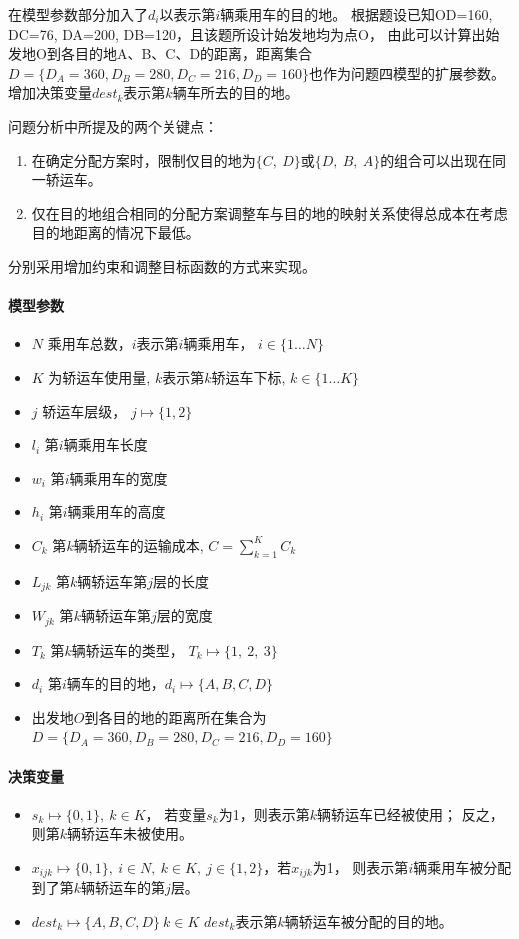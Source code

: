 \documentclass[UTF8]{ctexart}
\begin{document}
	在模型参数部分加入了$d_i$以表示第$i$辆乘用车的目的地。
	根据题设已知OD=160, DC=76, DA=200, DB=120，且该题所设计始发地均为点O，
	由此可以计算出始发地O到各目的地A、B、C、D的距离，距离集合
	$D=\{D_A=360, D_B=280, D_C=216, D_D=160\}$也作为问题四模型的扩展参数。\\
	
	增加决策变量$dest_k$表示第$k$辆车所去的目的地。
	
	问题分析中所提及的两个关键点：
	\begin{enumerate}
		\item 在确定分配方案时，限制仅目的地为$\{C,~D\}$或$\{D,~B,~A\}$的组合可以出现在同一轿运车。
		\item 仅在目的地组合相同的分配方案调整车与目的地的映射关系使得总成本在考虑目的地距离的情况下最低。
	\end{enumerate}
	分别采用增加约束和调整目标函数的方式来实现。
	
	
	
\paragraph{模型参数}
	\begin{itemize}
			\item $N$ 乘用车总数，$i$表示第$i$辆乘用车， $i \in \{1 \dots N\}$
			\item $K$ 为轿运车使用量, $k$表示第$k$轿运车下标,  $k \in \{1 \dots K\}$
			\item $j$ 轿运车层级， $j \mapsto \{1,2\}$
			\item $l_i$ 第$i$辆乘用车长度
			\item $w_i$ 第$i$辆乘用车的宽度
			\item $h_i$ 第$i$辆乘用车的高度
			\item $C_k$ 第$k$辆轿运车的运输成本, $C=\sum_{k=1}^{K}C_k$
			\item $L_{jk}$ 第$k$辆轿运车第$j$层的长度
			\item $W_{jk}$ 第$k$辆轿运车第$j$层的宽度
			\item $T_k$ 第$k$辆轿运车的类型， $T_k \mapsto \{1, ~2, ~3\}$
			\item $d_i$ 第$i$辆车的目的地，$d_i \mapsto \{A, B, C, D\}$		
			\item 出发地$O$到各目的地的距离所在集合为 $D=\{D_A=360, D_B=280, D_C=216, D_D=160\}$
		\end{itemize}
\paragraph{决策变量}
	\begin{itemize}
		\item $s_k \mapsto \{0,1\}, ~ k \in K$， 若变量$s_k$为1，则表示第$k$辆轿运车已经被使用；
		反之，则第$k$辆轿运车未被使用。
		\item $x_{ijk}\mapsto \{0,1\}, ~ i\in N,~ k \in K,~ j\in \{1,2\}$，若$x_{ijk}$为1，
		则表示第$i$辆乘用车被分配到了第$k$辆轿运车的第$j$层。
		\item $dest_k \mapsto \{A,B,C,D\}  ~ k \in K$ $dest_k$表示第$k$辆轿运车被分配的目的地。
	\end{itemize}
\end{document}
